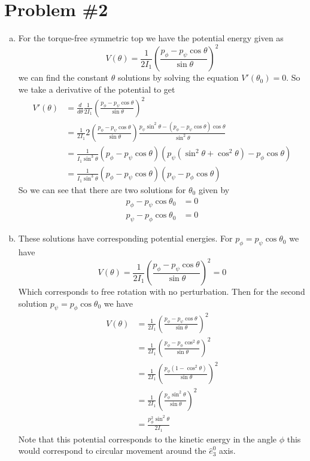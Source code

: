 \documentclass[11pt]{article}
\numberwithin{equation}{section}
\begin{document}
\pagebreak

\section{Problem \#2}
\begin{enumerate}[(a)]
\item For the torque-free symmetric top we have the potential energy given as
$$V(\theta) = \frac{1}{2I_1}\left(\frac{p_{\phi}-p_{\psi}\cos\theta}{\sin\theta}\right)^2$$
we can find the constant $\theta$ solutions by solving the equation $V'(\theta_0) = 0$. So 
we take a derivative of the potential to get
\begin{align*}
V'(\theta) &= \frac{d}{d\theta}\frac{1}{2I_1}\left(\frac{p_{\phi}-p_{\psi}\cos\theta}{\sin\theta}\right)^2\\
&= \frac{1}{2I_1}2\left(\frac{p_{\phi}-p_{\psi}\cos\theta}{\sin\theta}\right)\frac{p_{\psi}\sin^2\theta-(p_{\phi}-p_{\psi}\cos\theta)\cos\theta}{\sin^2\theta}\\
&= \frac{1}{I_1\sin^3\theta}\left(p_{\phi}-p_{\psi}\cos\theta\right)(p_{\psi}(\sin^2\theta+\cos^2\theta)-p_{\phi}\cos\theta)\\
&= \frac{1}{I_1\sin^3\theta}\left(p_{\phi}-p_{\psi}\cos\theta\right)(p_{\psi}-p_{\phi}\cos\theta)
\end{align*}
So we can see that there are two solutions for $\theta_0$ given by
\begin{align*}
p_{\phi}-p_{\psi}\cos\theta_0 &= 0\\
p_{\psi}-p_{\phi}\cos\theta_0 &= 0
\end{align*}

\item These solutions have corresponding potential energies. For $p_{\phi}=p_{\psi}\cos\theta_0$ we have
$$V(\theta) = \frac{1}{2I_1}\left(\frac{p_{\phi}-p_{\psi}\cos\theta}{\sin\theta}\right)^2 = 0$$
Which corresponds to free rotation with no perturbation. Then for the second solution $p_{\psi}=p_{\phi}\cos\theta_0$ we have
\begin{align*}
V(\theta) &= \frac{1}{2I_1}\left(\frac{p_{\phi}-p_{\psi}\cos\theta}{\sin\theta}\right)^2\\
&= \frac{1}{2I_1}\left(\frac{p_{\phi}-p_{\phi}\cos^2\theta}{\sin\theta}\right)^2\\
&= \frac{1}{2I_1}\left(\frac{p_{\phi}(1-\cos^2\theta)}{\sin\theta}\right)^2\\
&= \frac{1}{2I_1}\left(\frac{p_{\phi}\sin^2\theta}{\sin\theta}\right)^2\\
&= \frac{p_{\phi}^2\sin^2\theta}{2I_1}
\end{align*}
Note that this potential corresponds to the kinetic energy in the angle $\phi$ this would 
correspond to circular movement around the $\hat{e}^{0}_3$ axis. 
\end{enumerate}
\end{document}
